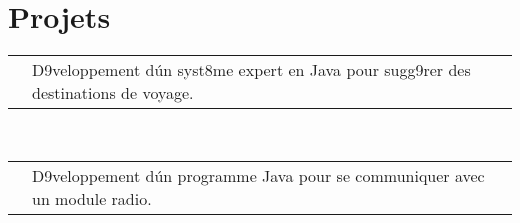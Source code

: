 \documentclass[11pt,a4paper,sans]{moderncv}
\makeatletter
\renewcommand*{\cvline}[3][.25em]{%
	  \begin{tabular}{@{}p{\hintscolumnwidth}@{\hspace{\separatorcolumnwidth}}p{\maincolumnwidth}@{}}%
          \centering\hintfont{#2} &{#3}%
	  \end{tabular}\\[#1]}
\makeatother
\begin{document}
\section{Projets}
\cvline{Intelligence Artificielle}{D\xc3\xa9veloppement d\'un syst\xc3\xa8me expert en Java pour sugg\xc3\xa9rer des destinations de voyage. \newline{\emph{Impl\xc3\xa9mentation des m\xc3\xa9thodes de chainage et cr\xc3\xa9ation de l\'interface graphique en Swing}} \newline{\emph{}}\ENTRYSPACE}
\cvline{Analyse de Donn\xc3\xa9es}{D\xc3\xa9veloppement d\'un programme Java pour se communiquer avec un module radio. \newline{\emph{Documentation de l\'application et \xc3\xa9laboration d\'un guide d\'utilisation}} \newline{\emph{Contr\xc3\xb4le de version avec Git}}}
\end{document}
